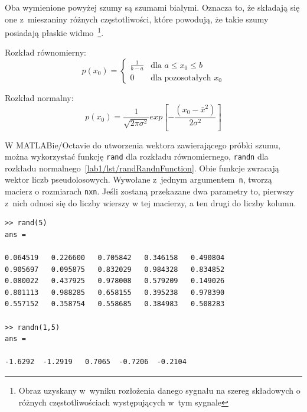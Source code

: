 Oba wymienione powyżej szumy są szumami białymi. Oznacza to, że składają się one z~mieszaniny różnych częstotliwości, które powodują, że takie szumy posiadają płaskie widmo~\footnote{Obraz uzyskany w~wyniku rozłożenia danego sygnału na szereg składowych o różnych częstotliwościach występujących w~tym sygnale}.


Rozkład równomierny:
\begin{equation}\label{lab1/eq/uniformDistribution}
	p(x_0) =
	\begin{cases} 
		\frac{1}{b-a} & \text{dla $a  \leq  x_0  \leq  b$} \\
		0 & \text{dla pozosotałych $x_0$}
	\end{cases}
\end{equation}

Rozkład normalny:
\begin{equation}\label{lab1/eq/normalDistribution}
	p(x_0) = \frac{1}{\sqrt{2\pi\sigma^2}} exp\left[-\frac{(x_0 - \bar{x}^2)}{2\sigma^2} \right]
\end{equation}

W MATLABie/Octavie do utworzenia wektora zawierającego próbki szumu, można wykorzystać funkcję \texttt{rand} dla rozkładu równomiernego, \texttt{randn} dla rozkładu normalnego~\ref{lab1/lst/randRandnFunction}. Obie funkcje zwracają wektor liczb pseudolosowych. Wywołane z~jednym argumentem~\texttt{n}, tworzą macierz o rozmiarach \texttt{nxn}. Jeśli zostaną przekazane dwa parametry to, pierwszy z~nich odnosi się do liczby wierszy w tej macierzy, a ten drugi do liczby kolumn. 

\begin{lstlisting}[caption=Tworzenie macierzy/wektora liczb pseudolosowych z~wykorzystaniem funkcji \texttt{rand} oraz \texttt{randn} , label=lab1/lst/randRandnFunction]
>> rand(5)
ans =

0.064519   0.226600   0.705842   0.346158   0.490804
0.905697   0.095875   0.832029   0.984328   0.834852
0.080022   0.437925   0.978008   0.579209   0.149026
0.801113   0.988285   0.658155   0.395238   0.978390
0.557152   0.358754   0.558685   0.384983   0.508283

>> randn(1,5)
ans =

-1.6292  -1.2919   0.7065  -0.7206  -0.2104
\end{lstlisting} 

